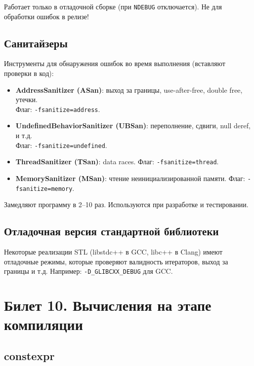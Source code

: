 \documentclass[12pt,a4paper]{article}
\begin{document}
Работает только в отладочной сборке (при \texttt{NDEBUG} отключается). Не для обработки ошибок в релизе!

\subsection{Санитайзеры}

Инструменты для обнаружения ошибок во время выполнения (вставляют проверки в код):

\begin{itemize}
    \item \textbf{AddressSanitizer (ASan)}: выход за границы, use-after-free, double free, утечки. \\Флаг: \texttt{-fsanitize=address}.
    \item \textbf{UndefinedBehaviorSanitizer (UBSan)}: переполнение, сдвиги, null deref, и т.д. \\Флаг: \texttt{-fsanitize=undefined}.
    \item \textbf{ThreadSanitizer (TSan)}: data races. Флаг: \texttt{-fsanitize=thread}.
    \item \textbf{MemorySanitizer (MSan)}: чтение неинициализированной памяти. Флаг: \texttt{-fsanitize=memory}.
\end{itemize}

Замедляют программу в 2--10 раз. Используются при разработке и тестировании.

\subsection{Отладочная версия стандартной библиотеки}

Некоторые реализации STL (libstdc++ в GCC, libc++ в Clang) имеют отладочные режимы, которые проверяют валидность итераторов, выход за границы и т.д. Например: \texttt{-D\_GLIBCXX\_DEBUG} для GCC.

\section{Билет 10. Вычисления на этапе компиляции}

\subsection{constexpr}
\end{document}
